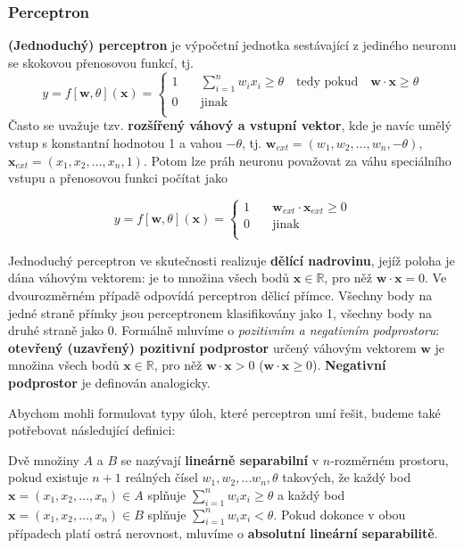 \documentclass[11pt]{report} %
\newcommand{\R}{\mathbb{R}}
\renewcommand{\vec}[1]{\mathbf{#1}}
\numberwithin{equation}{section}
\begin{document}
\subsubsection{Perceptron}
\textbf{(Jednoduchý) perceptron} je výpočetní jednotka sestávající z jediného neuronu se skokovou přenosovou funkcí, tj.
$$
y = f[\vec{w},\theta](\vec{x}) = 
\begin{cases}
1 	& \quad \sum\limits_{i=1}^n w_i x_i \geq \theta \quad \text{tedy pokud} \quad \vec{w}\cdot\vec{x} \geq \theta\\
0 	& \quad \text{jinak}\\
\end{cases}
$$
Často se uvažuje tzv. \textbf{rozšířený váhový a vstupní vektor}, kde je navíc umělý vstup s konstantní hodnotou 1 a vahou $-\theta$, tj. $\vec{w}_{ext} = (w_1, w_2, \dots, w_n, -\theta)$, $\vec{x}_{ext} = (x_1, x_2, \dots, x_n, 1)$. Potom lze práh neuronu považovat za váhu speciálního vstupu a přenosovou funkci počítat jako 

$$
y = f[\vec{w},\theta](\vec{x}) = 
\begin{cases}
1 	& \quad \vec{w}_{ext}\cdot\vec{x}_{ext} \geq 0\\
0 	& \quad \text{jinak}\\
\end{cases}
$$

Jednoduchý perceptron ve skutečnosti realizuje \textbf{dělící nadrovinu}, jejíž poloha je dána váhovým vektorem: je to množina všech bodů $\vec{x} \in \R$, pro něž $\vec{w}\cdot\vec{x} = 0$. Ve dvourozměrném případě odpovídá perceptron dělicí přímce. Všechny body na jedné straně přímky jsou perceptronem klasifikovány jako 1, všechny body na druhé straně jako 0. Formálně mluvíme o \textit{pozitivním a negativním podprostoru}: \textbf{otevřený (uzavřený) pozitivní podprostor} určený váhovým vektorem $\vec{w}$ je množina všech bodů $\vec{x} \in \R$, pro něž $\vec{w}\cdot\vec{x} > 0$ ($\vec{w}\cdot\vec{x} \geq 0$). \textbf{Negativní podprostor} je definován analogicky.

Abychom mohli formulovat typy úloh, které perceptron umí řešit, budeme také potřebovat následující definici:

Dvě množiny $A$ a $B$ se nazývají \textbf{lineárně separabilní} v $n$-rozměrném prostoru, pokud existuje $n+1$ reálných čísel $w_1, w_2, \dots w_n, \theta$ takových, že každý bod $\vec{x} = (x_1, x_2, \dots, x_n) \in A$ splňuje $\sum\limits_{i=1}^n w_i x_i \geq \theta$ a každý bod $\vec{x} = (x_1, x_2, \dots, x_n) \in B$ splňuje $\sum\limits_{i=1}^n w_i x_i < \theta$. Pokud dokonce v obou případech platí ostrá nerovnost, mluvíme o \textbf{absolutní lineární separabilitě}. 
\end{document}
